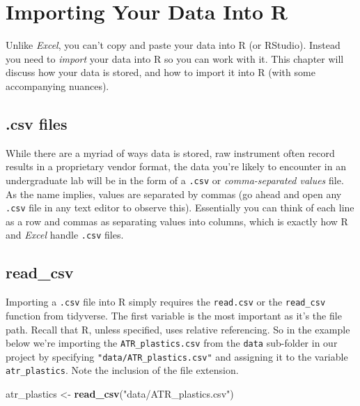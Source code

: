 \documentclass[
]{book}
\newenvironment{Shaded}{\begin{snugshade}}{\end{snugshade}}
\newcommand{\FunctionTok}[1]{\textcolor[rgb]{0.13,0.29,0.53}{\textbf{#1}}}
\newcommand{\NormalTok}[1]{#1}
\newcommand{\OtherTok}[1]{\textcolor[rgb]{0.56,0.35,0.01}{#1}}
\newcommand{\StringTok}[1]{\textcolor[rgb]{0.31,0.60,0.02}{#1}}
\begin{document}
\hypertarget{importing-your-data-into-r}{%
\chapter{Importing Your Data Into R}\label{importing-your-data-into-r}}

Unlike \emph{Excel}, you can't copy and paste your data into R (or RStudio). Instead you need to \emph{import} your data into R so you can work with it. This chapter will discuss how your data is stored, and how to import it into R (with some accompanying nuances).

\hypertarget{csv-files}{%
\section{.csv files}\label{csv-files}}

While there are a myriad of ways data is stored, raw instrument often record results in a proprietary vendor format, the data you're likely to encounter in an undergraduate lab will be in the form of a \texttt{.csv} or \emph{comma-separated values} file. As the name implies, values are separated by commas (go ahead and open any \texttt{.csv} file in any text editor to observe this). Essentially you can think of each line as a row and commas as separating values into columns, which is exactly how R and \emph{Excel} handle \texttt{.csv} files.

\hypertarget{read_csv}{%
\section{read\_csv}\label{read_csv}}

Importing a \texttt{.csv} file into R simply requires the \texttt{read.csv} or the \texttt{read\_csv} function from tidyverse. The first variable is the most important as it's the file path. Recall that R, unless specified, uses relative referencing. So in the example below we're importing the \texttt{ATR\_plastics.csv} from the \texttt{data} sub-folder in our project by specifying \texttt{"data/ATR\_plastics.csv"} and assigning it to the variable \texttt{atr\_plastics}. Note the inclusion of the file extension.

\begin{Shaded}
\begin{Highlighting}[]
\NormalTok{atr\_plastics }\OtherTok{\textless{}{-}} \FunctionTok{read\_csv}\NormalTok{(}\StringTok{"data/ATR\_plastics.csv"}\NormalTok{)}
\end{Highlighting}
\end{Shaded}
\end{document}
